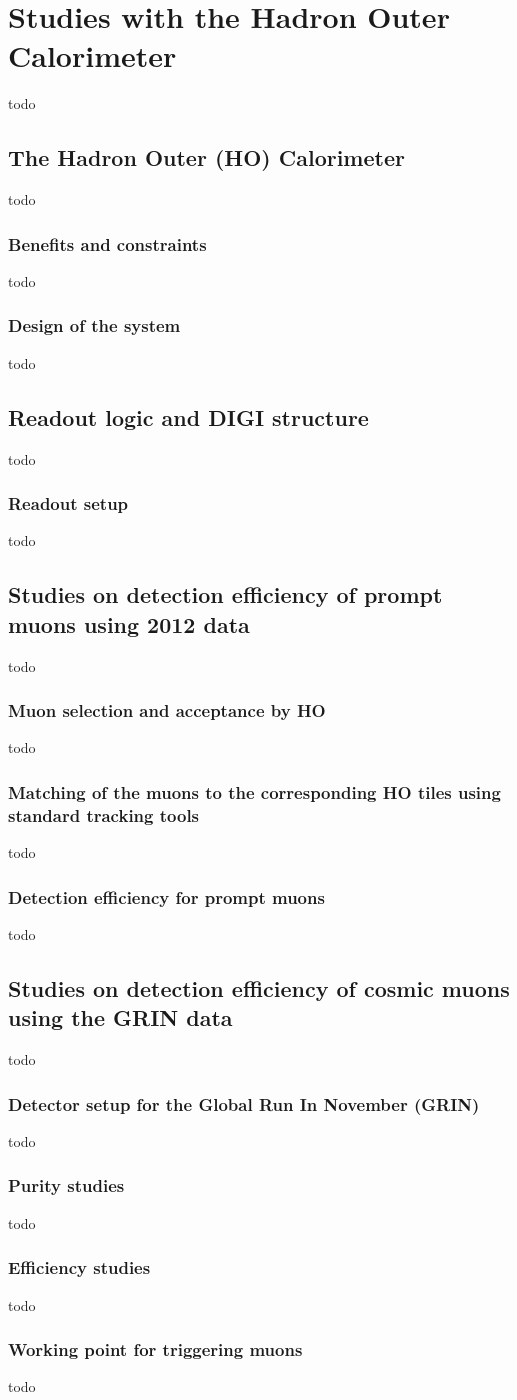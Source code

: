 \section{Studies with the Hadron Outer Calorimeter}
todo
 \subsection{The Hadron Outer (HO) Calorimeter}
 todo
  \subsubsection{Benefits and constraints}
  todo
  \subsubsection{Design of the system}
  todo
 \subsection{Readout logic and DIGI structure}
 todo
  \subsubsection{Readout setup}
  todo
 \subsection{Studies on detection efficiency of prompt muons using 2012 data}
 todo
  \subsubsection{Muon selection and acceptance by HO}
  todo
  \subsubsection{Matching of the muons to the corresponding HO tiles using standard tracking tools}
  todo
  \subsubsection{Detection efficiency for prompt muons}
  todo
 \subsection{Studies on detection efficiency of cosmic muons using the GRIN
 data} todo
  \subsubsection{Detector setup for the Global Run In November (GRIN)}
  todo
  \subsubsection{Purity studies}
  todo
  \subsubsection{Efficiency studies}
  todo
  \subsubsection{Working point for triggering muons}
  todo
